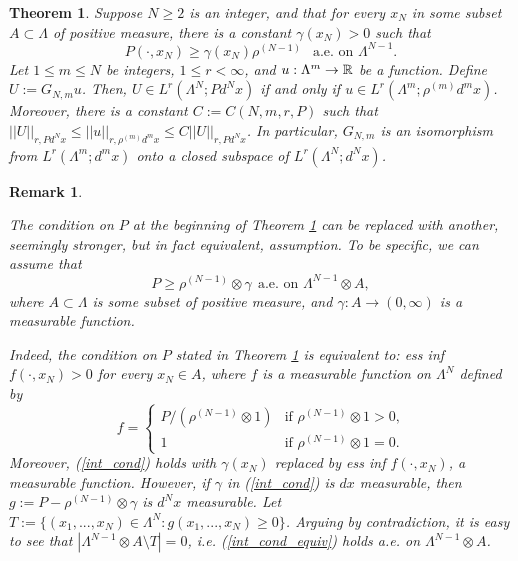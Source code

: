 \documentclass[12pt,leqno]{amsart}
\newtheorem{theor}{Theorem}[section]{\bf}{\it}
\newtheorem{rem}{Remark}[section]{\bf}{\rm}
\numberwithin{equation}{section}
\numberwithin{theor}{section}
\numberwithin{rem}{section}
\begin{document}
\begin{theor}
\label{Theor3}
Suppose $N\geq 2$ is an integer, and that for every $x_N$ in some subset $A\subset \Lambda$ of positive measure, 
there is a constant $\gamma(x_N)>0$ such that 
\begin{equation}
\label{int_cond}
P(\cdot,x_N)\geq \gamma(x_N)\rho^{(N-1)}~~\text{ a.e. on $\Lambda^{N-1}$}.  
\end{equation}
Let $1\leq m\leq N$ be integers, $1\leq r<\infty$, and 
$u:\Lambda^m\rightarrow \Bbb{R}$ be a function.  
Define $U:= G_{N,m} u$.   
Then, \newline
$U\in L^{r}(\Lambda^N; Pd^{N}x)$ if and only if 
$u\in L^{r}(\Lambda^m; \rho^{(m)}d^{m}x)$.  
Moreover, there is a 
constant $C:=C(N,m,r,P)$ such that\newline
$|| U||_{r, P d^{N} x}\leq || u ||_{r,\rho^{(m)} d^{m}x}\leq 
C || U ||_{r, P d^{N} x}$.  In particular, 
$G_{N,m}$ is an isomorphism from $L^{r}(\Lambda^m; d^{m}x)$ onto a closed subspace of 
$L^{r}(\Lambda^N; d^{N}x)$.
\end{theor}
\begin{rem}
\label{rem_int}
\rm{The condition on $P$ at the beginning of Theorem 
\ref{Theor3} can be replaced with another, seemingly stronger, but in fact equivalent, assumption.  To be specific, we can assume that    
\begin{equation}
\label{int_cond_equiv}
P\geq \rho^{(N-1)}\otimes \gamma~~\text{a.e. on $\Lambda^{N-1}\otimes A$},  
\end{equation}
where $A\subset \Lambda$ is some subset of positive measure, and $\gamma: A\rightarrow (0,\infty)$ is 
a measurable function.

Indeed, the condition on $P$ stated in Theorem \ref{Theor3} is equivalent to:
ess inf $f(\cdot, x_N)>0$ for every $x_N\in A$, where $f$ is a measurable function on 
$\Lambda^N$ defined by
\begin{equation}
f=\left \{  
\begin{array}{ll}
P\slash (\rho^{(N-1)}\otimes 1)&\text{if 
$\rho^{(N-1)}\otimes 1>0$,}\\
1&\text{if $\rho^{(N-1)}\otimes 1=0$.}
\end{array}
\right .
\end{equation}
Moreover, (\ref{int_cond}) holds with $\gamma(x_N)$ replaced by ess inf $f(\cdot, x_N)$, a measurable function.    
However, if $\gamma$ in (\ref{int_cond}) is $dx$ measurable, 
then $g:= P-\rho^{(N-1)}\otimes \gamma$ is $d^{N} x$ 
measurable.  Let $T:=\{(x_1,...,x_N)\in \Lambda^{N}: 
g(x_1,...,x_N)\geq 0\}$.  Arguing by contradiction, it is easy 
to see that $|\Lambda^{N-1}\otimes A\setminus T | =0$, i.e. 
(\ref{int_cond_equiv}) holds a.e. on $\Lambda^{N-1}\otimes A$.  

}

\end{rem}
\end{document}
